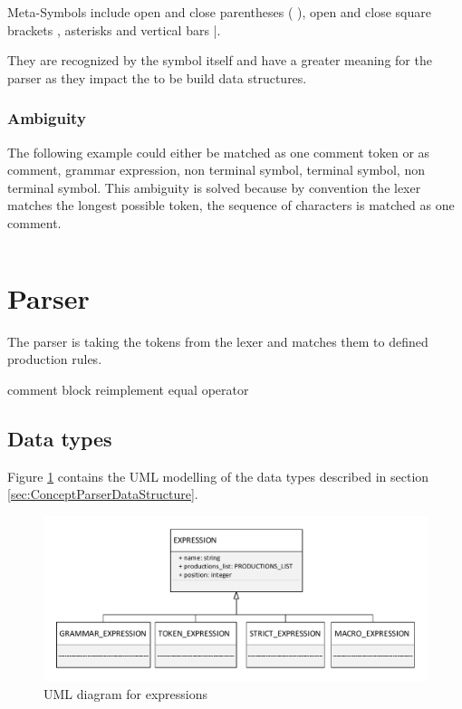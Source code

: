 Meta-Symbols include open and close parentheses \dq( )\dq, open and close square brackets \dq[ ]\dq, asterisks \dq *\dq and vertical bars \dq |\dq.

They are recognized by the symbol itself and have a greater meaning for the parser as they impact the to be build data structures. 

\subsubsection{Ambiguity}

The following example could either be matched as one comment token or as comment, grammar expression, non terminal symbol, terminal symbol, non terminal symbol.
This ambiguity is solved because by convention the lexer matches the longest possible token, the sequence of characters is matched as one comment.
\begin{lstlisting}[basicstyle=\scriptsize	,caption= Commented out production rule,label= lst:Lexer_example]
%----   <formula_role> ::= <user_role>-<source>
\end{lstlisting}
\section{Parser}\label{sec:ImplementationParser}

The parser is taking the tokens from the lexer and matches them to defined production rules.




comment block reimplement equal operator

\subsection{Data types}\label{sec:ImplementationDataTypes}
Figure \ref{fig:ImplementationUMLExpressions} contains the UML modelling of the data types described in section \ref{sec:ConceptParserDataStructure}.
\begin{figure}[H]
\centering
\includegraphics[width=1\textwidth]{images/uml_data_types_expressions.pdf}
\caption{UML diagram for expressions}
\label{fig:ImplementationUMLExpressions}
\end{figure}


